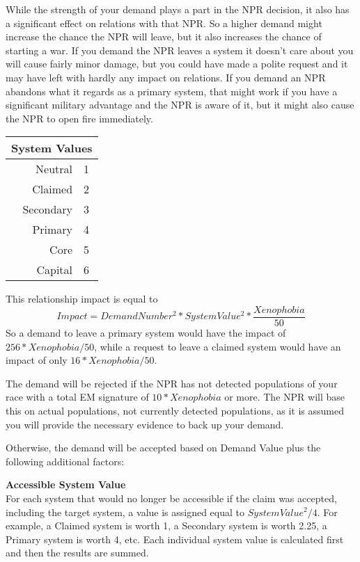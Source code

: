 \documentclass[../../Aurora C# unofficial manual.tex]{subfiles}
\begin{document}
	While the strength of your demand plays a part in the NPR decision, it also has a significant effect on relations with that NPR. So a higher demand might increase the chance the NPR will leave, but it also increases the chance of starting a war. If you demand the NPR leaves a system it doesn't care about you will cause fairly minor damage, but you could have made a polite request and it may have left with hardly any impact on relations. If you demand an NPR abandons what it regards as a primary system, that might work if you have a significant military advantage and the NPR is aware of it, but it might also cause the NPR to open fire immediately.
	
	\begin{center}
		\begin{tabular}{|r|l|}
			\hline
			\multicolumn{2}{|c|}{\textbf{System Values}} \\
			\hline
			Neutral & 1 \\
			\hline
			Claimed & 2 \\
			\hline
			Secondary & 3 \\
			\hline
			Primary& 4 \\
			\hline
			Core & 5 \\
			\hline
			Capital & 6 \\
			\hline
		\end{tabular}
	\end{center}
	
	This relationship impact is equal to
	\[ Impact = Demand Number^{2} * System Value^{2} * \frac{Xenophobia}{50} \]
	So a demand to leave a primary system would have the impact of \( 256 * Xenophobia / 50 \), while a request to leave a claimed system would have an impact of only \( 16 * Xenophobia / 50 \).
	
	The demand will be rejected if the NPR has not detected populations of your race with a total EM signature of \( 10 * Xenophobia \) or more. The NPR will base this on actual populations, not currently detected populations, as it is assumed you will provide the necessary evidence to back up your demand.
	
	Otherwise, the demand will be accepted based on Demand Value plus the following additional factors:
	
	\textbf{Accessible System Value}\\
	For each system that would no longer be accessible if the claim was accepted, including the target system, a value is assigned equal to \( System Value^{2} / 4 \). For example, a Claimed system is worth 1, a Secondary system is worth 2.25, a Primary system is worth 4, etc. Each individual system value is calculated first and then the results are summed.
	
\end{document}
